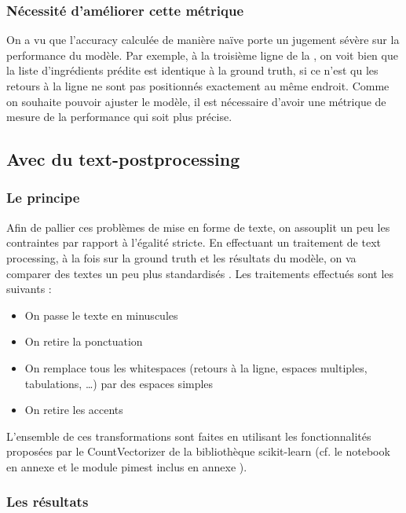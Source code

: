                 \subsubsection{Nécessité d'améliorer cette métrique}
                On a vu que l'accuracy calculée de manière naïve porte un jugement sévère sur la performance du modèle.
                Par exemple, à la troisième ligne de la , on voit bien que la liste d'ingrédients prédite est identique à la ground truth, si ce n'est qu les retours à la ligne ne sont pas positionnés exactement au même endroit.
                Comme on souhaite pouvoir ajuster le modèle, il est nécessaire d'avoir une métrique de mesure de la performance qui soit plus précise.

            \subsection{Avec du \og text-postprocessing \fg}

                \subsubsection{Le principe}
                Afin de pallier ces problèmes de mise en forme de texte, on assouplit un peu les contraintes par rapport à l'égalité stricte.
                En effectuant un traitement de text processing, à la fois sur la ground truth et les résultats du modèle, on va comparer des textes un peu plus \og standardisés \fg.
                Les traitements effectués sont les suivants :
                \begin{itemize}
                    \item On passe le texte en minuscules
                    \item On retire la ponctuation
                    \item On remplace tous les \og whitespaces \fg (retours à la ligne, espaces multiples, tabulations, \dots) par des espaces simples
                    \item On retire les accents
                \end{itemize}
                L'ensemble de ces transformations sont faites en utilisant les fonctionnalités proposées par le CountVectorizer de la bibliothèque scikit-learn (cf. le notebook en annexe  et le module pimest inclus en annexe ).

                \subsubsection{Les résultats}

